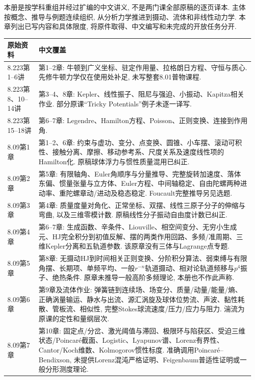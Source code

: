 本册是按学科重组并经过扩编的中文讲义, 不是两门课全部原稿的逐页译本. 主体按概念、推导与例题连续组织, 从分析力学推进到摄动、流体和非线性动力学. 本章列出已写内容和具体限度, 将原件取得、中文编写和未完成的开放任务分开.

\begin{longtable}{p{}p{}}
\toprule 原始资料 & 中文覆盖\\\midrule
8.223第1--6讲 & 第1--2章: 牛顿到广义坐标、驻定作用量、拉格朗日方程、守恒与质心. 先修牛顿力学仅在使用处补足, 未写整套8.01普物课程.\\
8.223第8、10--14讲 & 第3--4、8章: Kepler、线性振子、阻尼与强迫、小振动、Kapitza相关作业. 部分原课“Tricky Potentials”例子未逐一译写.\\
8.223第15--18讲 & 第6--7章: Legendre、Hamilton方程、Poisson、正则变换、连接到作用角.\\
8.09第1章 & 第1--2、6章: 约束与虚功、变分、点变换、圆锥、小车摆、滚动可积性、接触分离、摩擦、移动参考系、尺度关系及速度线性项的Hamilton化. 原稿球体浮力与惯性质量混用已纠正.\\
8.09第2章 & 第5章: 有限轴角、Euler角顺序与分量推导、完整旋转加速度、落体东偏、惯量张量与立方体、Euler方程、中间轴稳定、自由陀螺两种进动率、重陀螺章动/进动及稳态稳定. Foucault完整推导另见选题.\\
8.09第3章 & 第4章: 质量度量对角化、正常坐标、双摆、线性三原子分子的伸缩与弯曲, 以及三维零模计数. 原稿线性分子振动自由度计数已纠正.\\
8.09第4章 & 第6--7章: 生成函数、辛条件、Liouville、相空间变分、无穷小生成元、HJ完全积分到初值反解、摆的两类作用回路、多频/准周期、三维Kepler分离和五轨道参数. 该原章没有三体与Lagrange点专题.\\
8.09第5章 & 第8章: 无摄动HJ到时间相关正则变换、分阶积分算法、弱束缚与有限角摆、长期项、单频平均、一般$r^{-n}$轨道摄动、相对论轨道频移与$p^4$振子、绝热条件. 原章未推导一般高阶多频理论, 本册也不作此声称.\\
8.09第6章 & 第9章及流体作业: 弹簧链到连续场、场变分、质量/动量/能量/熵、正确涡量输运、静水与出流、源汇涡旋及球体位势流、声波、黏性耗散、管板流、相似性, 完整Stokes球流速度/压力/应力与阻力. 湍流为原课的定性和量纲层次.\\
8.09第7章 & 第10章: 固定点/分岔、激光阈值与滞回、极限环与陷获区、受迫三维状态/Poincaré截面、Logistic、Lyapunov谱、Lorenz有界性、Cantor/Koch维数、Kolmogorov惯性标度. 准确调用Poincaré--Bendixson, 未提供Lorenz混沌严格证明、Feigenbaum普适性证明或一般分形测度理论.\\\bottomrule
\end{longtable}

